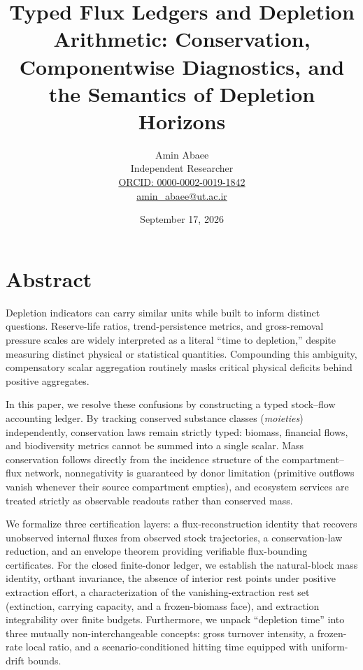 \documentclass[11pt]{article}
\begin{document}
\title{Typed Flux Ledgers and Depletion Arithmetic: Conservation, Componentwise Diagnostics, and the Semantics of Depletion Horizons}
\author{Amin Abaee\\[0.35em]
{\small Independent Researcher}\\[0.55em]
{\small\href{https://orcid.org/\allowbreak{}0000-0002-0019-1842}{ORCID: 0000-0002-0019-1842}}\\[0.3em]
{\small\href{mailto:amin\_abaee@ut.ac.ir}{amin\_abaee@ut.ac.ir}}}
\date{September 17, 2026}
\maketitle

\section*{Abstract}\label{abstract}

Depletion indicators can carry similar units while built to inform distinct questions. Reserve-life ratios, trend-persistence metrics, and gross-removal pressure scales are widely interpreted as a literal ``time to depletion,'' despite measuring distinct physical or statistical quantities. Compounding this ambiguity, compensatory scalar aggregation routinely masks critical physical deficits behind positive aggregates.

In this paper, we resolve these confusions by constructing a typed stock--flow accounting ledger. By tracking conserved substance classes (\emph{moieties}) independently, conservation laws remain strictly typed: biomass, financial flows, and biodiversity metrics cannot be summed into a single scalar. Mass conservation follows directly from the incidence structure of the compartment--flux network, nonnegativity is guaranteed by donor limitation (primitive outflows vanish whenever their source compartment empties), and ecosystem services are treated strictly as observable readouts rather than conserved mass.

We formalize three certification layers: a flux-reconstruction identity that recovers unobserved internal fluxes from observed stock trajectories, a conservation-law reduction, and an envelope theorem providing verifiable flux-bounding certificates. For the closed finite-donor ledger, we establish the natural-block mass identity, orthant invariance, the absence of interior rest points under positive extraction effort, a characterization of the vanishing-extraction rest set (extinction, carrying capacity, and a frozen-biomass face), and extraction integrability over finite budgets. Furthermore, we unpack ``depletion time'' into three mutually non-interchangeable concepts: gross turnover intensity, a frozen-rate local ratio, and a scenario-conditioned hitting time equipped with uniform-drift bounds.
\end{document}
